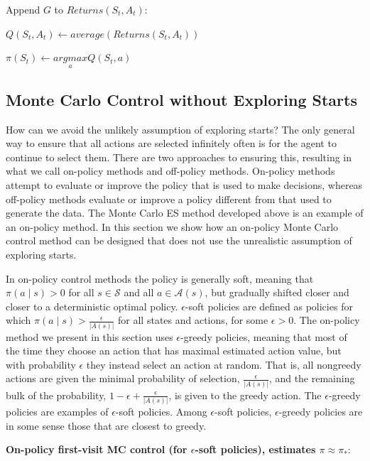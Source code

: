 \documentclass{article}
\begin{document}
\hspace{1.5cm} Append \(G\) to \(Returns(S_t, A_t)\):

\hspace{1.5cm} \(Q(S_t, A_t) \leftarrow average(Returns(S_t, A_t))\)

\hspace{1.5cm} \(\pi(S_t) \leftarrow \underset{a}{argmax} Q(S_t, a)\)

\subsection{Monte Carlo Control without Exploring Starts}

How can we avoid the unlikely assumption of exploring starts? The only general way to ensure that all actions are selected infinitely often is for the agent to continue to select them. 
There are two approaches to ensuring this, resulting in what we call on-policy methods and off-policy methods. On-policy methods attempt to evaluate or improve the policy that is used to make decisions, 
whereas off-policy methods evaluate or improve a policy different from that used to generate the data. The Monte Carlo ES method developed above is an example of an on-policy method. 
In this section we show how an on-policy Monte Carlo control method can be designed that does not use the unrealistic assumption of exploring starts.

In on-policy control methods the policy is generally soft, meaning that \(\pi(a \mid s) > 0\) for all \(s \in \mathcal{S}\) and all \(a \in \mathcal{A}(s)\), 
but gradually shifted closer and closer to a deterministic optimal policy. 
\(\epsilon\)-soft policies are defined as policies for which \(\pi(a \mid s) > \frac{\epsilon}{\vert A(s) \vert}\) for all states and actions, for some \(\epsilon > 0\).
The on-policy method we present in this section uses \(\epsilon\)-greedy policies, 
meaning that most of the time they choose an action that has maximal estimated action value, but with probability \(\epsilon\) they instead select an action at random.
That is, all nongreedy actions are given the minimal probability of selection, \(\frac{\epsilon}{\vert A(s) \vert}\), 
and the remaining bulk of the probability, \(1 - \epsilon + \frac{\epsilon}{\vert A(s) \vert}\), is given to the greedy action.
The \(\epsilon\)-greedy policies are examples of \(\epsilon\)-soft policies. Among \(\epsilon\)-soft policies, \(\epsilon\)-greedy policies are in some sense those that are closest to greedy.

\textbf{On-policy first-visit MC control (for \(\epsilon\)-soft policies), estimates \(\pi \approx \pi_*\)}:
\end{document}
